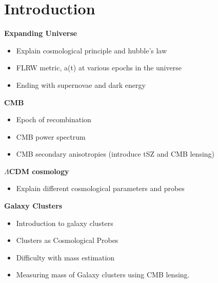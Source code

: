 \chapter{Introduction}
\label{ch:Intro}

\textbf{Expanding Universe} 
\begin{itemize}
\item Explain cosmological principle and hubble's law
\item FLRW metric, a(t) at various epochs in the universe 
\item Ending with supernovae and dark energy
\end{itemize}
\textbf{CMB}
\begin{itemize}
\item Epoch of recombination
\item CMB power spectrum
\begin{figure}
\end{figure}
\item CMB secondary anisotropies (introduce tSZ and CMB lensing)
\end{itemize}
\textbf{$\Lambda$CDM cosmology}
\begin{itemize}
\item Explain different cosmological parameters and probes
\end{itemize}
\textbf{Galaxy Clusters}
\begin{itemize}
\item Introduction to galaxy clusters
\item Clusters as Cosmological Probes
\item Difficulty with mass estimation
\item Measuring mass of Galaxy clusters using CMB lensing.
\end{itemize}
